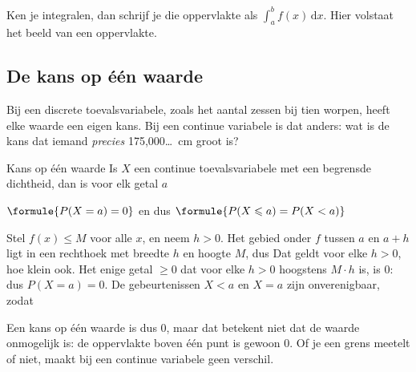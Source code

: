 Ken je integralen, dan schrijf je die oppervlakte als $\int_a^b f(x)\,\mathrm{d}x$. Hier volstaat het beeld van een oppervlakte.

\subsection{De kans op één waarde}

Bij een discrete toevalsvariabele, zoals het aantal zessen bij tien worpen, heeft elke waarde een eigen kans. Bij een continue variabele is dat anders: wat is de kans dat iemand \textit{precies} 175,000\ldots\ cm groot is?

\begin{theorie}
\begin{stelling}{Kans op één waarde}
Is $X$ een continue toevalsvariabele met een begrensde dichtheid, dan is voor elk getal $a$

\vspace{1mm}
\qquad $\formule{P(X = a) = 0}$ \qquad en dus \qquad $\formule{P(X \leqslant a) = P(X < a)}$
\end{stelling}

\begin{bewijs}
Stel $f(x) \leqslant M$ voor alle $x$, en neem $h > 0$. Het gebied onder $f$ tussen $a$ en $a + h$ ligt in een rechthoek met breedte $h$ en hoogte $M$, dus
Dat geldt voor elke $h > 0$, hoe klein ook. Het enige getal $\geqslant 0$ dat voor elke $h > 0$ hoogstens $M \cdot h$ is, is 0: dus $P(X = a) = 0$. De gebeurtenissen $X < a$ en $X = a$ zijn onverenigbaar, zodat
\end{bewijs}
\end{theorie}

Een kans op één waarde is dus 0, maar dat betekent niet dat de waarde onmogelijk is: de oppervlakte boven één punt is gewoon 0. Of je een grens meetelt of niet, maakt bij een continue variabele geen verschil.

